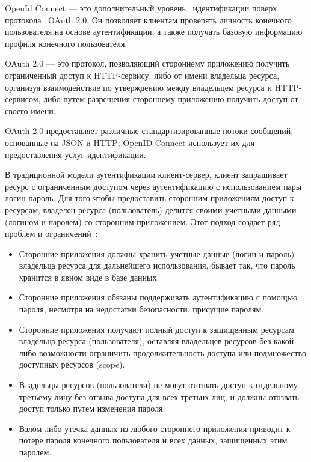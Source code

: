 OpenId Connect — это дополнительный уровень~\cite{siriwardenaOpenid2020, sakimuraOpenid2014} идентификации поверх протокола~\cite{hardt2012oauth} OAuth 2.0.
Он позволяет клиентам проверять личность конечного пользователя на основе аутентификации,
а также получать базовую информацию профиля конечного пользователя.

OAuth 2.0 — это протокол, позволяющий стороннему приложению получить ограниченный доступ к HTTP-сервису, либо от имени владельца ресурса,
организуя взаимодействие по утверждению между владельцем ресурса и HTTP-сервисом, либо путем разрешения стороннему приложению получить
доступ от своего имени.

OAuth 2.0 предоставляет различные стандартизированные потоки сообщений, основанные на JSON и HTTP; OpenID Connect использует их для предоставления
услуг идентификации.

В традиционной модели аутентификации клиент-сервер, клиент запрашивает ресурс с ограниченным доступом
через аутентификацию с использованием пары логин-пароль.
Для того чтобы предоставить сторонним приложениям доступ к ресурсам,
владелец ресурса (пользователь) делится своими учетными данными (логином и паролем) со сторонним приложением.
Этот подход создает ряд проблем и ограничений~\cite{hardt2012oauth}:
\begin{itemize}
    \item Сторонние приложения должны хранить учетные данные (логин и пароль) владельца ресурса для дальнейшего использования,
    бывает так, что пароль хранится в явном виде в базе данных.
    \item Сторонние приложения обязаны поддерживать аутентификацию с помощью пароля, несмотря на недостатки безопасности, присущие паролям.
    \item Сторонние приложения получают полный доступ к защищенным ресурсам владельца ресурса (пользователя),
    оставляя владельцев ресурсов без какой-либо возможности ограничить продолжительность доступа или подмножество доступных ресурсов (scope).
    \item Владельцы ресурсов (пользователи) не могут отозвать доступ к отдельному третьему лицу без отзыва доступа для всех третьих лиц,
    и должны отозвать доступ только путем изменения пароля.
    \item Взлом либо утечка данных из любого стороннего приложения приводит к потере пароля конечного пользователя и всех данных,
    защищенных этим паролем.
\end{itemize}

